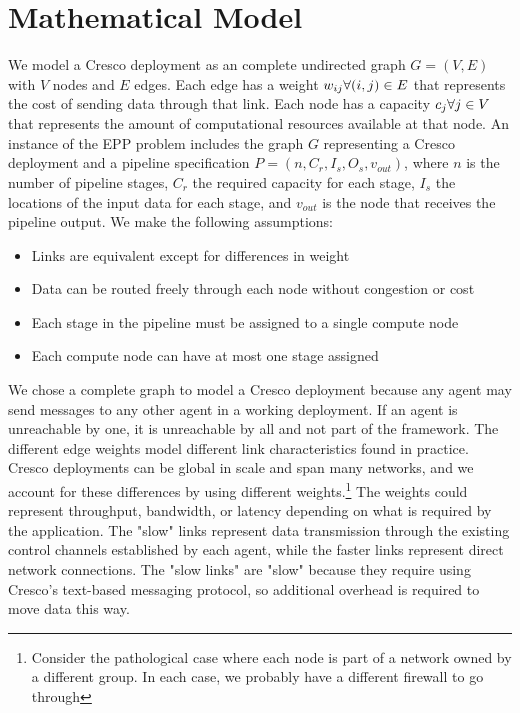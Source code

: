 \documentclass{article}
\newcommand{\forallv}[1]{\ensuremath{\forall #1 \in V}}
\newcommand{\foralle}[2]{\ensuremath{\forall (#1,#2) \in E }}
\begin{document}
    \section{Mathematical Model}
	We model a Cresco deployment as an complete undirected graph $G=(V,E)$ with $V$ nodes and $E$ edges. Each edge has a weight $w_{ij} \space \foralle{i}{j}$ that represents the cost of sending data through that link. Each node has a capacity $c_{j} \space \forallv{j}$ that represents the amount of computational resources available at that node. An instance of the EPP problem includes the graph $G$ representing a Cresco deployment and a pipeline specification $P = (n,C_{r},I_{s},O_{s},v_{out})$, where  $n$ is the number of pipeline stages, $C_{r}$ the required capacity for each stage, $I_{s}$ the locations of the input data for each stage, and $v_{out}$ is the node that receives the pipeline output. We make the following assumptions:
	\begin{itemize}
		\item Links are equivalent except for differences in weight
		\item Data can be routed freely through each node without congestion or cost
		\item Each stage in the pipeline must be assigned to a single compute node
		\item Each compute node can have at most one stage assigned
	\end{itemize}
	
	We chose a complete graph to model a Cresco deployment because any agent may send messages to any other agent in a working deployment. If an agent is unreachable by one, it is unreachable by all and not part of the framework. The different edge weights model different link characteristics found in practice. Cresco deployments can be global in scale and span many networks, and we account for these differences by using different weights.\footnote{Consider the pathological case where each node is part of a network owned by a different group. In each case, we probably have a different firewall to go through} The weights could represent throughput, bandwidth, or latency depending on what is required by the application. The "slow" links represent data transmission through the existing control channels established by each agent, while the faster links represent direct network connections. The "slow links" are "slow" because they require using Cresco's text-based messaging protocol, so additional overhead is required to move data this way.
	
 
	
	
	
	
	
	
	
	
\end{document}
